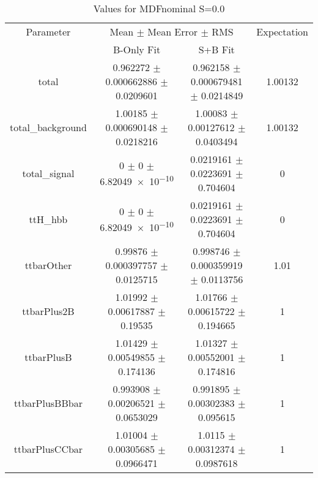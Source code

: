 \begin{table}
\centering
\caption{Values for MDFnominal S=0.0}
\begin{tabular}{cccc}
\toprule
Parameter & \multicolumn{2}{c}{Mean $\pm$ Mean Error $\pm$ RMS} & Expectation\\
 & B-Only Fit & S+B Fit & \\
\midrule
total & \num{0.962272} $\pm$ \num{0.000662886} $\pm$ \num{0.0209601} & \num{0.962158} $\pm$ \num{0.000679481} $\pm$ \num{0.0214849} & \num{1.00132}\\
total\_background & \num{1.00185} $\pm$ \num{0.000690148} $\pm$ \num{0.0218216} & \num{1.00083} $\pm$ \num{0.00127612} $\pm$ \num{0.0403494} & \num{1.00132}\\
total\_signal & \num{0} $\pm$ \num{0} $\pm$ \num{6.82049e-10} & \num{0.0219161} $\pm$ \num{0.0223691} $\pm$ \num{0.704604} & \num{0}\\
ttH\_hbb & \num{0} $\pm$ \num{0} $\pm$ \num{6.82049e-10} & \num{0.0219161} $\pm$ \num{0.0223691} $\pm$ \num{0.704604} & \num{0}\\
ttbarOther & \num{0.99876} $\pm$ \num{0.000397757} $\pm$ \num{0.0125715} & \num{0.998746} $\pm$ \num{0.000359919} $\pm$ \num{0.0113756} & \num{1.01}\\
ttbarPlus2B & \num{1.01992} $\pm$ \num{0.00617887} $\pm$ \num{0.19535} & \num{1.01766} $\pm$ \num{0.00615722} $\pm$ \num{0.194665} & \num{1}\\
ttbarPlusB & \num{1.01429} $\pm$ \num{0.00549855} $\pm$ \num{0.174136} & \num{1.01327} $\pm$ \num{0.00552001} $\pm$ \num{0.174816} & \num{1}\\
ttbarPlusBBbar & \num{0.993908} $\pm$ \num{0.00206521} $\pm$ \num{0.0653029} & \num{0.991895} $\pm$ \num{0.00302383} $\pm$ \num{0.095615} & \num{1}\\
ttbarPlusCCbar & \num{1.01004} $\pm$ \num{0.00305685} $\pm$ \num{0.0966471} & \num{1.0115} $\pm$ \num{0.00312374} $\pm$ \num{0.0987618} & \num{1}\\
\bottomrule
\end{tabular}
\end{table}